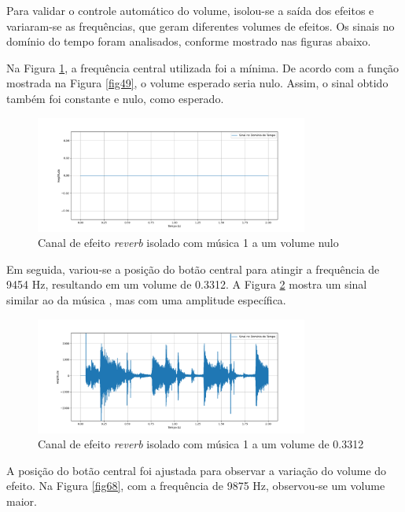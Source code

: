Para validar o controle automático do volume, isolou-se a saída dos efeitos e variaram-se as frequências, que geram diferentes volumes de efeitos. Os sinais no domínio do tempo foram analisados, conforme mostrado nas figuras abaixo.

Na Figura \ref{fig66}, a frequência central utilizada foi a mínima. De acordo com a função mostrada na Figura \ref{fig49}, o volume esperado seria nulo. Assim, o sinal obtido também foi constante e nulo, como esperado.

\begin{figure}[h]
    \centering
    \includegraphics[width=0.8\textwidth]{figuras/fig66.png}
    \caption{Canal de efeito \textit{reverb} isolado com música 1 a um volume nulo}
    \label{fig66}
\end{figure}

Em seguida, variou-se a posição do botão central para atingir a frequência de 9454 Hz, resultando em um volume de 0.3312. A Figura \ref{fig67} mostra um sinal similar ao da música \cite{track01}, mas com uma amplitude específica.

\begin{figure}[h]
    \centering
    \includegraphics[width=0.8\textwidth]{figuras/fig67.png}
    \caption{Canal de efeito \textit{reverb} isolado com música 1 a um volume de 0.3312}
    \label{fig67}
\end{figure}

A posição do botão central foi ajustada para observar a variação do volume do efeito. Na Figura \ref{fig68}, com a frequência de 9875 Hz, observou-se um volume maior.

